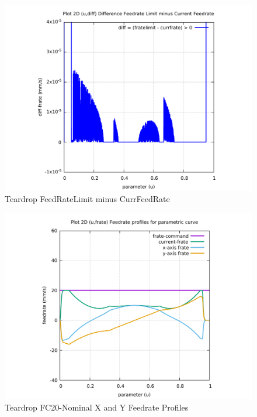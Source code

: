 \begin{figure}
	\caption     {Teardrop FeedRateLimit minus CurrFeedRate}
	\label{12-img-Teardrop-FeedRateLimit-minus-CurrFeedRate.pdf}
	\includegraphics[width=1.00\textwidth]{Chap4/appendix/app-Teardrop/plots/12-img-Teardrop-FeedRateLimit-minus-CurrFeedRate.pdf}
\end{figure}

\clearpage
\pagebreak

\begin{figure}
	\caption     {Teardrop FC20-Nominal X and Y Feedrate Profiles}
	\label{13-img-Teardrop-FC20-Nominal-X-and-Y-Feedrate-Profiles.pdf}
	\includegraphics[width=1.00\textwidth]{Chap4/appendix/app-Teardrop/plots/13-img-Teardrop-FC20-Nominal-X-and-Y-Feedrate-Profiles.pdf}
\end{figure}


